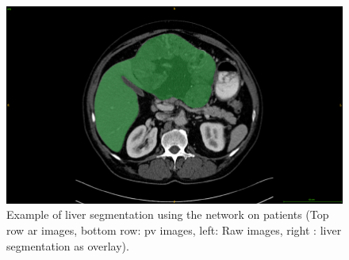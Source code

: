 \begin{figure}[ht!]
\begin{minipage}{0.45\linewidth}
	\end{minipage}
	\hspace{0.3cm}
	\begin{minipage}{0.45\linewidth}
		\includegraphics[width=0.9\linewidth]{../HistologicalGradePrediction/images/ResizeTCIA_CECTLiver_prediction_TCGA-DD-A11A_slice42_greenLiver}
	\end{minipage}
	\caption{Example of liver segmentation using the  network on \textbf{}
	patients (Top row \ac{ar} images, bottom row: \ac{pv} images, left:
	Raw images, right : liver segmentation as overlay).}
	\label{fig:LiverPredTciaDb}
\end{figure}

